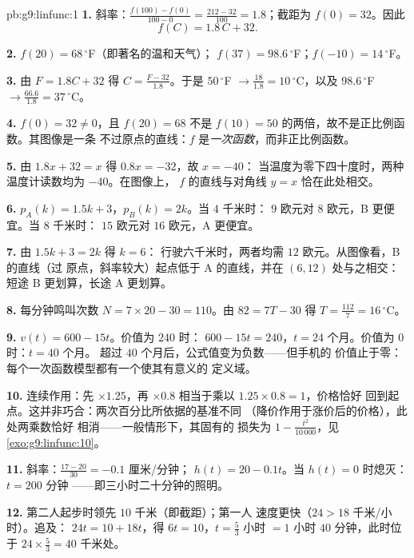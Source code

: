 \begin{solution}{pb:g9:linfunc:1}
\textbf{1.} 斜率：$\frac{f(100) - f(0)}{100 - 0} =
\frac{212 - 32}{100} = 1.8$；截距为 $f(0) = 32$。因此
\[
f(C) = 1.8\,C + 32 .
\]

\textbf{2.} $f(20) = 68\,^\circ$F（即著名的温和天气）；
$f(37) = 98.6\,^\circ$F；$f(-10) = 14\,^\circ$F。

\textbf{3.} 由 $F = 1.8C + 32$ 得
$C = \frac{F - 32}{1.8}$。于是 $50\,^\circ$F
$\to \frac{18}{1.8} = 10\,^\circ$C，以及 $98.6\,^\circ$F
$\to \frac{66.6}{1.8} = 37\,^\circ$C。

\textbf{4.} $f(0) = 32 \neq 0$，且 $f(20) = 68$ 不是
$f(10) = 50$ 的两倍，故不是正比例函数。其图像是一条
不过原点的直线：$f$ 是\emph{一次函数}，而非正比例函数。

\textbf{5.} 由 $1.8x + 32 = x$ 得 $0.8x = -32$，故 $x = -40$：
当温度为零下四十度时，两种温度计读数均为 $-40$。在图像上，
$f$ 的直线与对角线 $y = x$ 恰在此处相交。

\textbf{6.} $p_A(k) = 1.5k + 3$，$p_B(k) = 2k$。当 $4$ 千米时：
$9$ 欧元对 $8$ 欧元，B 更便宜。当 $8$ 千米时：
$15$ 欧元对 $16$ 欧元，A 更便宜。

\textbf{7.} 由 $1.5k + 3 = 2k$ 得 $k = 6$：
行驶六千米时，两者均需 $12$ 欧元。从图像看，B 的直线（过
原点，斜率较大）起点低于 A 的直线，并在
$(6, 12)$ 处与之相交：短途 B 更划算，长途 A 更划算。

\textbf{8.} 每分钟鸣叫次数 $N = 7 \times 20 - 30 = 110$。由
$82 = 7T - 30$ 得 $T = \frac{112}{7} = 16\,^\circ$C。

\textbf{9.} $v(t) = 600 - 15t$。价值为 $240$ 时：
$600 - 15t = 240$，$t = 24$ 个月。价值为 $0$ 时：$t = 40$ 个月。
超过 $40$ 个月后，公式值变为负数——但手机的
价值止于零：每个一次函数模型都有一个使其有意义的
定义域。

\textbf{10.} 连续作用：先 $\times 1.25$，再 $\times 0.8$
相当于乘以 $1.25 \times 0.8 = 1$，价格恰好
回到起点。这并非巧合：两次百分比所依据的基准不同
（降价作用于涨价后的价格），此处两乘数恰好
相消——一般情形下，其固有的
损失为 $1 - \frac{t^2}{10\,000}$，见
\cref{exo:g9:linfunc:10}。

\textbf{11.} 斜率：$\frac{17 - 20}{30} = -0.1$ 厘米/分钟；
$h(t) = 20 - 0.1t$。当 $h(t) = 0$ 时熄灭：$t = 200$ 分钟
——即三小时二十分钟的照明。

\textbf{12.} 第二人起步时领先 $10$ 千米（即截距）；第一人
速度更快（$24 > 18$ 千米/小时）。追及：
$24t = 10 + 18t$，得 $6t = 10$，$t = \frac53$ 小时 $= 1$ 小时 $40$
分钟，此时位于 $24 \times \frac53 = 40$ 千米处。


\end{solution}
